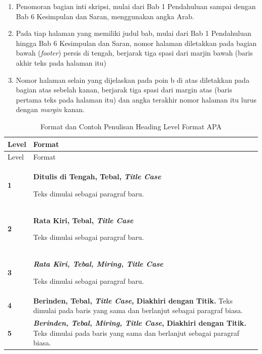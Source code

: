 \documentclass[
  indonesian,
  letterpaper,
]{scrbook}
\providecommand{\tightlist}{%
  \setlength{\itemsep}{0pt}\setlength{\parskip}{0pt}}
\begin{document}
\begin{enumerate}
\def\labelenumi{\alph{enumi}.}
\tightlist
\item
  Penomoran bagian inti skripsi, mulai dari Bab 1 Pendahuluan sampai
  dengan Bab 6 Kesimpulan dan Saran, menggunakan angka Arab.
\item
  Pada tiap halaman yang memiliki judul bab, mulai dari Bab 1
  Pendahuluan hingga Bab 6 Kesimpulan dan Saran, nomor halaman
  diletakkan pada bagian bawah (\emph{footer}) persis di tengah,
  berjarak tiga spasi dari marjin bawah (baris akhir teks pada halaman
  itu)
\item
  Nomor halaman selain yang dijelaskan pada poin b di atas diletakkan
  pada bagian atas sebelah kanan, berjarak tiga spasi dari margin atas
  (baris pertama teks pada halaman itu) dan angka terakhir nomor halaman
  itu lurus dengan \emph{margin} kanan.
\end{enumerate}

\begin{longtable}[]{@{}
  >{\centering\arraybackslash}p{}
  >{\raggedright\arraybackslash}p{}@{}}
\caption{Format dan Contoh Penulisan Heading Level Format
APA}\label{tbl-headinglevel}\tabularnewline
\toprule\noalign{}
\begin{minipage}[b]{\linewidth}\centering
Level
\end{minipage} & \begin{minipage}[b]{\linewidth}\raggedright
Format
\end{minipage} \\
\midrule\noalign{}
\endfirsthead
\toprule\noalign{}
\begin{minipage}[b]{\linewidth}\centering
Level
\end{minipage} & \begin{minipage}[b]{\linewidth}\raggedright
Format
\end{minipage} \\
\midrule\noalign{}
\endhead
\bottomrule\noalign{}
\endlastfoot
\textbf{1} & \textbf{Ditulis di Tengah, Tebal, \emph{Title Case}}

Teks dimulai sebagai paragraf baru. \\
\textbf{2} & \textbf{Rata Kiri, Tebal, \emph{Title Case}}

Teks dimulai sebagai paragraf baru. \\
\textbf{3} & \textbf{\emph{Rata Kiri, Tebal, Miring, Title Case}}

Teks dimulai sebagai paragraf baru. \\
\textbf{4} & \textbf{Berinden, Tebal, \emph{Title Case}, Diakhiri dengan
Titik.} Teks dimulai pada baris yang sama dan berlanjut sebagai paragraf
biasa. \\
\textbf{5} & \textbf{\emph{Berinden, Tebal, Miring, Title Case},
Diakhiri dengan Titik.} Teks dimulai pada baris yang sama dan berlanjut
sebagai paragraf biasa. \\
\end{longtable}
\end{document}
